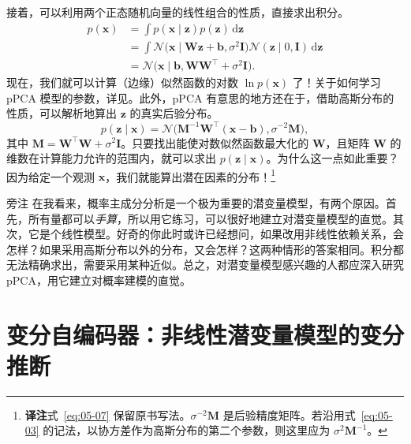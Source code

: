 接着，可以利用两个正态随机向量的线性组合的性质，直接求出积分。
\begin{align}
p(\mathbf{x})&=\int p(\mathbf{x}\mid\mathbf{z})p(\mathbf{z})\,\mathrm{d}\mathbf{z} \tag{5.4}\label{eq:05-04}\\
 &=\int \mathcal{N}\bigl(\mathbf{x}\mid\mathbf{W}\mathbf{z}+\mathbf{b},\sigma^2\mathbf{I}\bigr)
       \mathcal{N}(\mathbf{z}\mid 0,\mathbf{I})\,\mathrm{d}\mathbf{z} \tag{5.5}\label{eq:05-05}\\
 &=\mathcal{N}\bigl(\mathbf{x}\mid\mathbf{b},\mathbf{W}\mathbf{W}^\top+\sigma^2\mathbf{I}\bigr). \tag{5.6}\label{eq:05-06}
\end{align}
现在，我们就可以计算（边缘）似然函数的对数 $\ln p(\mathbf{x})$ 了！关于如何学习 pPCA 模型的参数，详见。此外，pPCA 有意思的地方还在于，借助高斯分布的性质，可以解析地算出 $\mathbf{z}$ 的真实后验分布。
\begin{equation}
p(\mathbf{z}\mid\mathbf{x})=\mathcal{N}\bigl(\mathbf{M}^{-1}\mathbf{W}^\top(\mathbf{x}-\mathbf{b}),\sigma^{-2}\mathbf{M}\bigr),
\tag{5.7}\label{eq:05-07}
\end{equation}
其中 $\mathbf{M}=\mathbf{W}^\top\mathbf{W}+\sigma^2\mathbf{I}$。只要找出能使对数似然函数最大化的 $\mathbf{W}$，且矩阵 $\mathbf{W}$ 的维数在计算能力允许的范围内，就可以求出 $p(\mathbf{z}\mid\mathbf{x})$。为什么这一点如此重要？因为给定一个观测 $\mathbf{x}$，我们就能算出潜在因素的分布！\footnote{\textbf{译注}\quad 式~\eqref{eq:05-07} 保留原书写法。$\sigma^{-2}\mathbf{M}$ 是后验精度矩阵。若沿用式~\eqref{eq:05-03} 的记法，以协方差作为高斯分布的第二个参数，则这里应为 $\sigma^2\mathbf{M}^{-1}$。}

\begin{booknote}{旁注}
在我看来，概率主成分分析是一个极为重要的潜变量模型，有两个原因。首先，所有量都可以\emph{手算}，所以用它练习，可以很好地建立对潜变量模型的直觉。其次，它是个线性模型。好奇的你此时或许已经想问，如果改用非线性依赖关系，会怎样？如果采用高斯分布以外的分布，又会怎样？这两种情形的答案相同。积分都无法精确求出，需要采用某种近似。总之，对潜变量模型感兴趣的人都应深入研究 pPCA，用它建立对概率建模的直觉。
\end{booknote}

\section{变分自编码器：非线性潜变量模型的变分推断}
\label{sec:vae}
